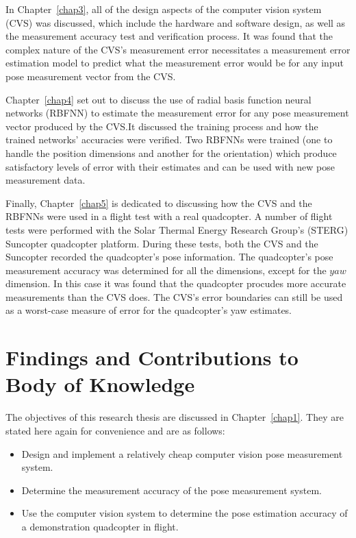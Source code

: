 In Chapter~\ref{chap3}, all of the design aspects of the computer vision system (CVS) was discussed, which include the hardware and software design, as well as the measurement accuracy test and verification process. It was found that the complex nature of the CVS's measurement error necessitates a measurement error estimation model to predict what the measurement error would be for any input pose measurement vector from the CVS.\@ 

Chapter~\ref{chap4} set out to discuss the use of radial basis function neural networks (RBFNN) to estimate the measurement error for any pose measurement vector produced by the CVS.\@ It discussed the training process and how the trained networks' accuracies were verified. Two RBFNNs were trained (one to handle the position dimensions and another for the orientation) which produce satisfactory levels of error with their estimates and can be used with new pose measurement data.

Finally, Chapter~\ref{chap5} is dedicated to discussing how the CVS and the RBFNNs were used in a flight test with a real quadcopter. A number of flight tests were performed with the Solar Thermal Energy Research Group's (STERG) Suncopter quadcopter platform. During these tests, both the CVS and the Suncopter recorded the quadcopter's pose information. The quadcopter's pose measurement accuracy was determined for all the dimensions, except for the $yaw$ dimension. In this case it was found that the quadcopter procudes more accurate measurements than the CVS does. The CVS's error boundaries can still be used as a worst-case measure of error for the quadcopter's yaw estimates. 


\section{Findings and Contributions to Body of Knowledge}

The objectives of this research thesis are discussed in Chapter~\ref{chap1}. They are stated here again for convenience and are as follows:

\begin{itemize}
  \item Design and implement a relatively cheap computer vision pose measurement system.
  \item Determine the measurement accuracy of the pose measurement system.
  \item Use the computer vision system to determine the pose estimation accuracy of a demonstration quadcopter in flight. 
\end{itemize}

